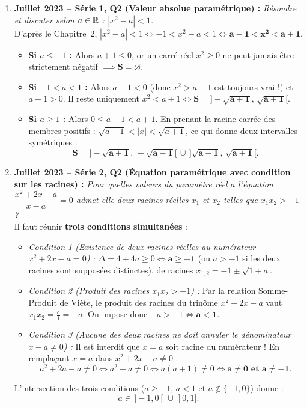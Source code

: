 \begin{exemple}
\begin{enumerate}
    \item \textbf{Juillet 2023 -- Série 1, Q2 (Valeur absolue paramétrique) :} \emph{Résoudre et discuter selon $a \in \mathbb{R}$ : $|x^2 - a| < 1$.}\\
    D'après le Chapitre~2, $|x^2 - a| < 1 \iff -1 < x^2 - a < 1 \iff \mathbf{a - 1 < x^2 < a + 1}$.
    \begin{itemize}
        \item \textbf{Si $a \le -1$ :} Alors $a + 1 \le 0$, or un carré réel $x^2 \ge 0$ ne peut jamais être strictement négatif $\implies \mathbf{S = \varnothing}$.
        \item \textbf{Si $-1 < a < 1$ :} Alors $a - 1 < 0$ (donc $x^2 > a - 1$ est toujours vrai !) et $a + 1 > 0$. Il reste uniquement $x^2 < a + 1 \iff \mathbf{S = \bigl]-\sqrt{a + 1},\, \sqrt{a + 1}\bigr[}$.
        \item \textbf{Si $a \ge 1$ :} Alors $0 \le a - 1 < a + 1$. En prenant la racine carrée des membres positifs : $\sqrt{a - 1} < |x| < \sqrt{a + 1}$, ce qui donne deux intervalles symétriques :
        \[
            \mathbf{S = \bigl]-\sqrt{a + 1},\, -\sqrt{a - 1}\bigr[ \,\cup\, \bigl]\sqrt{a - 1},\, \sqrt{a + 1}\bigr[}.
        \]
    \end{itemize}

    \item \textbf{Juillet 2023 -- Série 2, Q2 (Équation paramétrique avec condition sur les racines) :} \emph{Pour quelles valeurs du paramètre réel $a$ l'équation $\dfrac{x^2 + 2x - a}{x - a} = 0$ admet-elle deux racines réelles $x_1$ et $x_2$ telles que $x_1 x_2 > -1$ ?}\\
    Il faut réunir \textbf{trois conditions simultanées} :
    \begin{itemize}
        \item \emph{Condition 1 (Existence de deux racines réelles au numérateur $x^2 + 2x - a = 0$) :} $\Delta = 4 + 4a \ge 0 \iff \mathbf{a \ge -1}$ (ou $a > -1$ si les deux racines sont supposées distinctes), de racines $x_{1,2} = -1 \pm \sqrt{1 + a}$.
        \item \emph{Condition 2 (Produit des racines $x_1 x_2 > -1$) :} Par la relation Somme-Produit de Viète, le produit des racines du trinôme $x^2 + 2x - a$ vaut $x_1 x_2 = \frac{c}{1} = -a$. On impose donc $-a > -1 \iff \mathbf{a < 1}$.
        \item \emph{Condition 3 (Aucune des deux racines ne doit annuler le dénominateur $x - a \neq 0$) :} Il est interdit que $x = a$ soit racine du numérateur ! En remplaçant $x = a$ dans $x^2 + 2x - a \neq 0$ :
        \[
            a^2 + 2a - a \neq 0 \iff a^2 + a \neq 0 \iff a(a + 1) \neq 0 \iff \mathbf{a \neq 0 \text{ et } a \neq -1}.
        \]
    \end{itemize}
    L'intersection des trois conditions ($a \ge -1$, $a < 1$ et $a \notin \{-1, 0\}$) donne :
    \[
        \boxed{a \in \,]-1, 0[ \,\cup\, ]0, 1[}.
    \]
\end{enumerate}
\end{exemple}

